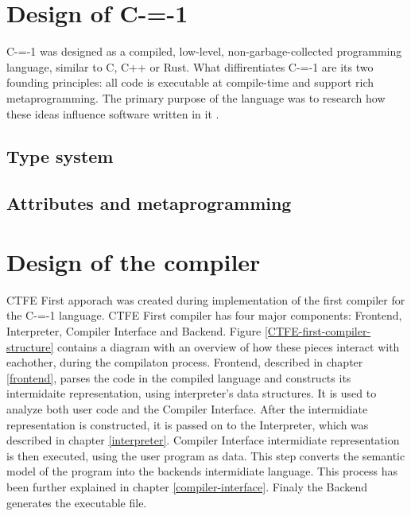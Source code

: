 \section{Design of C-=-1}
\label{language-design}

C-=-1 was designed as a compiled, low-level, non-garbage-collected programming language, similar to C, C++ or Rust.
What diffirentiates C-=-1 are its two founding principles: all code is executable at compile-time and support rich metaprogramming.
The primary purpose of the language was to research how these ideas influence software written in it \cite{grabski2022compilation}.

\subsection{Type system}

\subsection{Attributes and metaprogramming}

\section{Design of the compiler}
\label{compiler-design}

CTFE First apporach was created during implementation of the first compiler for the C-=-1 language\cite{grabski2022compilation}.
CTFE First compiler has four major components: Frontend, Interpreter, Compiler Interface and Backend.
Figure \ref{CTFE-first-compiler-structure} contains a diagram with an overview of how these pieces interact with eachother, during the compilaton process.
Frontend, described in chapter \ref{frontend}, parses the code in the compiled language and constructs its intermidaite representation, using interpreter's data structures.
It is used to analyze both user code and the Compiler Interface.
After the intermidiate representation is constructed, it is passed on to the Interpreter, which was described in chapter \ref{interpreter}.
Compiler Interface intermidiate representation is then executed, using the user program as data. 
This step converts the semantic model of the program into the backends intermidiate language.
This process has been further explained in chapter \ref{compiler-interface}.
Finaly the Backend generates the executable file.

